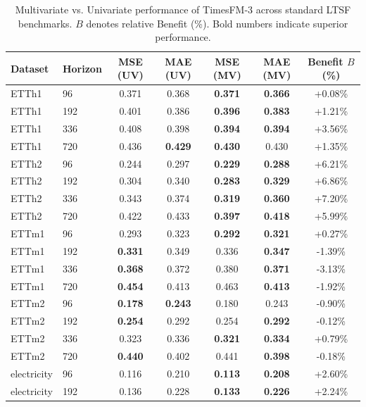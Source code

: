 \begin{table}[t]
\centering
\caption{Multivariate vs. Univariate performance of TimesFM-3 across standard LTSF benchmarks. $B$ denotes relative Benefit (\%). Bold numbers indicate superior performance.}
\label{tab:ltsf_main}
\small
\begin{tabular}{ll|cc|cc|c}
\toprule
\textbf{Dataset} & \textbf{Horizon} & \textbf{MSE (UV)} & \textbf{MAE (UV)} & \textbf{MSE (MV)} & \textbf{MAE (MV)} & \textbf{Benefit $B$ (\%)} \\
\midrule
ETTh1 & 96 & 0.371  & 0.368  &  \textbf{0.371} &  \textbf{0.366} & +0.08\% \\
ETTh1 & 192 & 0.401  & 0.386  &  \textbf{0.396} &  \textbf{0.383} & +1.21\% \\
ETTh1 & 336 & 0.408  & 0.398  &  \textbf{0.394} &  \textbf{0.394} & +3.56\% \\
ETTh1 & 720 & 0.436  & \textbf{0.429}  &  \textbf{0.430} &  0.430 & +1.35\% \\
ETTh2 & 96 & 0.244  & 0.297  &  \textbf{0.229} &  \textbf{0.288} & +6.21\% \\
ETTh2 & 192 & 0.304  & 0.340  &  \textbf{0.283} &  \textbf{0.329} & +6.86\% \\
ETTh2 & 336 & 0.343  & 0.374  &  \textbf{0.319} &  \textbf{0.360} & +7.20\% \\
ETTh2 & 720 & 0.422  & 0.433  &  \textbf{0.397} &  \textbf{0.418} & +5.99\% \\
ETTm1 & 96 & 0.293  & 0.323  &  \textbf{0.292} &  \textbf{0.321} & +0.27\% \\
ETTm1 & 192 & \textbf{0.331}  & 0.349  &  0.336 &  \textbf{0.347} & -1.39\% \\
ETTm1 & 336 & \textbf{0.368}  & 0.372  &  0.380 &  \textbf{0.371} & -3.13\% \\
ETTm1 & 720 & \textbf{0.454}  & 0.413  &  0.463 &  \textbf{0.413} & -1.92\% \\
ETTm2 & 96 & \textbf{0.178}  & \textbf{0.243}  &  0.180 &  0.243 & -0.90\% \\
ETTm2 & 192 & \textbf{0.254}  & 0.292  &  0.254 &  \textbf{0.292} & -0.12\% \\
ETTm2 & 336 & 0.323  & 0.336  &  \textbf{0.321} &  \textbf{0.334} & +0.79\% \\
ETTm2 & 720 & \textbf{0.440}  & 0.402  &  0.441 &  \textbf{0.398} & -0.18\% \\
electricity & 96 & 0.116  & 0.210  &  \textbf{0.113} &  \textbf{0.208} & +2.60\% \\
electricity & 192 & 0.136  & 0.228  &  \textbf{0.133} &  \textbf{0.226} & +2.24\% \\

\end{tabular}
\end{table}
